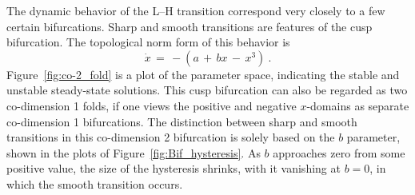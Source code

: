 The dynamic behavior of the L--H transition correspond very closely to a few certain bifurcations.
Sharp and smooth transitions are features of the cusp bifurcation.
The topological norm form of this behavior is
\begin{equation}
	\dot{x} \,=\, -(a \,+\, bx \,-\, x^3)~.
	\label{eq:sharp_bif}
\end{equation}
Figure~\ref{fig:co-2_fold} is a plot of the parameter space, indicating the stable and unstable steady-state solutions.
This cusp bifurcation can also be regarded as two co-dimension 1 folds, if one views the positive and negative $x$-domains as separate co-dimension 1 bifurcations.
The distinction between sharp and smooth transitions in this co-dimension 2 bifurcation is solely based on the $b$ parameter, shown in the plots of Figure~\ref{fig:Bif_hysteresis}.
As $b$ approaches zero from some positive value, the size of the hysteresis shrinks, with it vanishing at $b = 0$, in which the smooth transition occurs.

